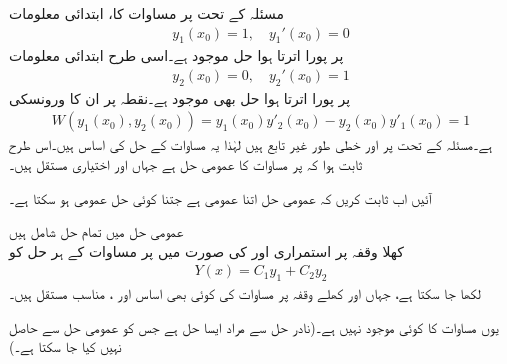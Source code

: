 مسئلہ  کے تحت   پر مساوات  کا، ابتدائی معلومات 
\begin{align*}
y_1(x_0)=1, \quad y_1'(x_0)=0
\end{align*}
پر پورا اترتا ہوا  حل   موجود ہے۔اسی طرح ابتدائی معلومات
\begin{align*}
y_2(x_0)=0, \quad y_2'(x_0)=1
\end{align*}
 پر پورا اترتا ہوا  حل  بھی موجود ہے۔نقطہ  پر ان کا ورونسکی
\begin{align*}
W(y_1(x_0),y_2(x_0))=y_1(x_0)y'_2(x_0)-y_2(x_0)y'_1(x_0)=1
\end{align*}
ہے۔مسئلہ  کے تحت  پر  اور  خطی طور غیر تابع ہیں لہٰذا یہ مساوات  کے حل کی اساس ہیں۔اس طرح ثابت ہوا کہ   پر  مساوات  کا عمومی حل  ہے جہاں  اور  اختیاری مستقل ہیں۔

آئیں اب ثابت کریں کہ عمومی حل اتنا عمومی ہے جتنا کوئی حل عمومی ہو سکتا ہے۔

\quad عمومی حل میں تمام حل شامل ہیں\\
کھلا وقفہ  پر استمراری  اور  کی صورت میں  پر مساوات  کے ہر حل
  کو
\begin{align}
Y(x)=C_1y_1+C_2y_2
\end{align}
لکھا جا سکتا ہے، جہاں  اور  کھلے وقفہ  پر مساوات  کی کوئی بھی اساس اور ،  مناسب مستقل ہیں۔

یوں مساوات  کا کوئی  موجود نہیں ہے۔(نادر حل سے مراد ایسا حل ہے جس کو عمومی حل سے حاصل نہیں کیا جا سکتا ہے۔)

